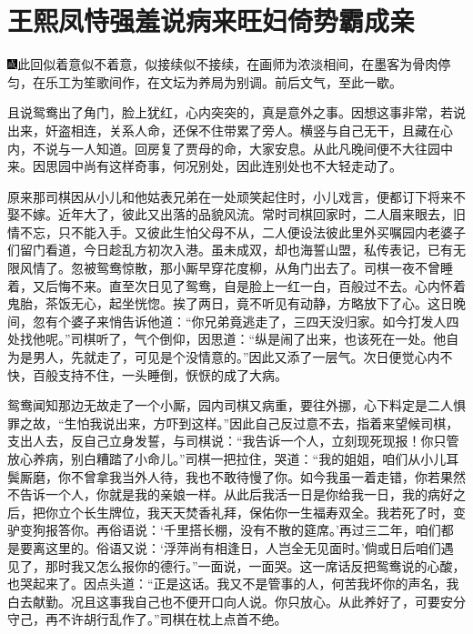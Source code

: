 \chapter{王熙凤恃强羞说病\hspace{.5em}来旺妇倚势霸成亲}

{\includegraphics[width=3mm]{../Images/00005}\kaishu 此回似着意似不着意，似接续似不接续，在画师为浓淡相间，在墨客为骨肉停匀，在乐工为笙歌间作，在文坛为养局为别调。前后文气，至此一歇。}

且说鸳鸯出了角门，脸上犹红，心内突突的，真是意外之事。因想这事非常，若说出来，奸盗相连，关系人命，还保不住带累了旁人。横竖与自己无干，且藏在心内，不说与一人知道。回房复了贾母的命，大家安息。从此凡晚间便不大往园中来。因思园中尚有这样奇事，何况别处，因此连别处也不大轻走动了。

原来那司棋因从小儿和他姑表兄弟在一处顽笑起住时，小儿戏言，便都订下将来不娶不嫁。近年大了，彼此又出落的品貌风流。常时司棋回家时，二人眉来眼去，旧情不忘，只不能入手。又彼此生怕父母不从，二人便设法彼此里外买嘱园内老婆子们留门看道，今日趁乱方初次入港。虽未成双，却也海誓山盟，私传表记，已有无限风情了。忽被鸳鸯惊散，那小厮早穿花度柳，从角门出去了。司棋一夜不曾睡着，又后悔不来。直至次日见了鸳鸯，自是脸上一红一白，百般过不去。心内怀着鬼胎，茶饭无心，起坐恍惚。挨了两日，竟不听见有动静，方略放下了心。这日晚间，忽有个婆子来悄告诉他道：“你兄弟竟逃走了，三四天没归家。如今打发人四处找他呢。”司棋听了，气个倒仰，因思道：“纵是闹了出来，也该死在一处。他自为是男人，先就走了，可见是个没情意的。”因此又添了一层气。次日便觉心内不快，百般支持不住，一头睡倒，恹恹的成了大病。

鸳鸯闻知那边无故走了一个小厮，园内司棋又病重，要往外挪，心下料定是二人惧罪之故，“生怕我说出来，方吓到这样。”因此自己反过意不去，指着来望候司棋，支出人去，反自己立身发誓，与司棋说：“我告诉一个人，立刻现死现报！你只管放心养病，别白糟踏了小命儿。”司棋一把拉住，哭道：“我的姐姐，咱们从小儿耳鬓厮磨，你不曾拿我当外人待，我也不敢待慢了你。如今我虽一着走错，你若果然不告诉一个人，你就是我的亲娘一样。从此后我活一日是你给我一日，我的病好之后，把你立个长生牌位，我天天焚香礼拜，保佑你一生福寿双全。我若死了时，变驴变狗报答你。再俗语说：‘千里搭长棚，没有不散的筵席。’再过三二年，咱们都是要离这里的。俗语又说：‘浮萍尚有相逢日，人岂全无见面时。’倘或日后咱们遇见了，那时我又怎么报你的德行。”一面说，一面哭。这一席话反把鸳鸯说的心酸，也哭起来了。因点头道：“正是这话。我又不是管事的人，何苦我坏你的声名，我白去献勤。况且这事我自己也不便开口向人说。你只放心。从此养好了，可要安分守己，再不许胡行乱作了。”司棋在枕上点首不绝。

